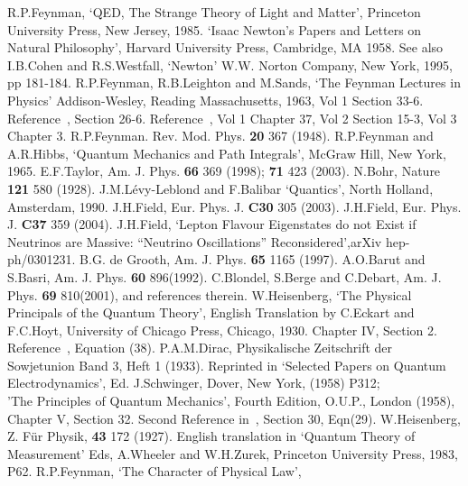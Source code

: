 {\begin{thebibliography}{99}
 R.P.Feynman, `QED, The Strange Theory of Light and Matter',
 Princeton University Press, New Jersey, 1985.
  `Isaac Newton's Papers and Letters on Natural Philosophy', 
 Harvard University Press, Cambridge, MA 1958. See also
 I.B.Cohen and R.S.Westfall, `Newton' W.W. Norton Company, New York, 1995, pp  181-184.
 R.P.Feynman, R.B.Leighton and M.Sands, `The Feynman Lectures in Physics'
 Addison-Wesley, Reading Massachusetts, 1963, Vol 1 Section 33-6.
 Reference~\cite{Feyn2}, Section 26-6.
 Reference~\cite{Feyn2}, Vol 1 Chapter 37, Vol 2 Section 15-3, Vol 3 Chapter 3.
  R.P.Feynman. Rev. Mod. Phys. {\bf 20} 367 (1948).
   R.P.Feynman and A.R.Hibbs, `Quantum Mechanics and Path Integrals',
  McGraw Hill, New York, 1965.
 E.F.Taylor, Am. J. Phys. {\bf 66} 369 (1998); {\bf 71} 423 (2003).
  N.Bohr, Nature {\bf 121} 580 (1928). 
 J.M.L\'{e}vy-Leblond and F.Balibar `Quantics',
 North Holland, Amsterdam, 1990. 
  J.H.Field, Eur. Phys. J. {\bf C30} 305 (2003).
 J.H.Field, Eur. Phys. J. {\bf C37} 359 (2004).
 J.H.Field, `Lepton Flavour Eigenstates do not Exist if Neutrinos are Massive:
   ``Neutrino Oscillations''  Reconsidered',arXiv hep-ph/0301231.
 B.G. de Grooth,  Am. J. Phys. {\bf 65} 1165 (1997).
 A.O.Barut and S.Basri,  Am. J. Phys. {\bf 60} 896(1992).
  C.Blondel, S.Berge and C.Debart, Am. J. Phys. {\bf 69} 810(2001),
 and references therein.
W.Heisenberg, `The Physical Principals of the Quantum Theory',
 English Translation by C.Eckart and F.C.Hoyt, University of Chicago Press,
 Chicago, 1930. Chapter IV, Section 2.
 Reference~\cite{Feyn5}, Equation (38).
  P.A.M.Dirac, Physikalische Zeitschrift der Sowjetunion Band 3, Heft 1 (1933).
 Reprinted in `Selected Papers on Quantum Electrodynamics',
  Ed. J.Schwinger, Dover, New York, (1958) P312; \\
 'The Principles of Quantum Mechanics',
 Fourth Edition, O.U.P., London (1958), Chapter V, Section 32.
Second Reference in~\cite{Dirac1}, Section 30, Eqn(29).
W.Heisenberg, Z. F\"{u}r Physik, {\bf 43} 172 (1927).
 English translation in `Quantum Theory of Measurement'
 Eds, A.Wheeler and W.H.Zurek, Princeton University Press, 1983, P62.
 R.P.Feynman, `The Character of Physical Law',

\end{thebibliography}}
